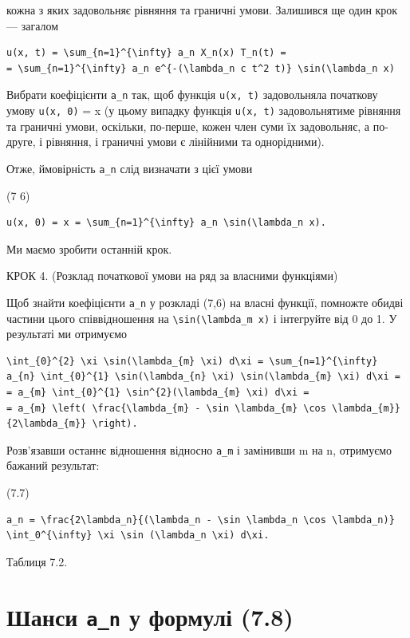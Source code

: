 \documentclass[
  ukrainian,
]{article}
\begin{document}
кожна з яких задовольняє рівняння та граничні умови. Залишився ще один
крок --- загалом

\begin{verbatim}
u(x, t) = \sum_{n=1}^{\infty} a_n X_n(x) T_n(t) =
= \sum_{n=1}^{\infty} a_n e^{-(\lambda_n c t^2 t)} \sin(\lambda_n x)
\end{verbatim}

Вибрати коефіцієнти \texttt{a\_n} так, щоб функція \texttt{u(x,\ t)}
задовольняла початкову умову \texttt{u(x,\ 0)} = x (у цьому випадку
функція \texttt{u(x,\ t)} задовольнятиме рівняння та граничні умови,
оскільки, по-перше, кожен член суми їх задовольняє, а по-друге, і
рівняння, і граничні умови є лінійними та однорідними).

Отже, ймовірність \texttt{a\_n} слід визначати з цієї умови

(7 6)

\begin{verbatim}
u(x, 0) = x = \sum_{n=1}^{\infty} a_n \sin(\lambda_n x).
\end{verbatim}

Ми маємо зробити останній крок.

КРОК 4. (Розклад початкової умови на ряд за власними функціями)

Щоб знайти коефіцієнти \texttt{a\_n} у розкладі (7,6) на власні функції,
помножте обидві частини цього співвідношення на
\texttt{\textbackslash{}sin(\textbackslash{}lambda\_m\ x)} і інтегруйте
від 0 до 1. У результаті ми отримуємо

\begin{verbatim}
\int_{0}^{2} \xi \sin(\lambda_{m} \xi) d\xi = \sum_{n=1}^{\infty} a_{n} \int_{0}^{1} \sin(\lambda_{n} \xi) \sin(\lambda_{m} \xi) d\xi =
= a_{m} \int_{0}^{1} \sin^{2}(\lambda_{m} \xi) d\xi =
= a_{m} \left( \frac{\lambda_{m} - \sin \lambda_{m} \cos \lambda_{m}}{2\lambda_{m}} \right).
\end{verbatim}

Розв'язавши останнє відношення відносно \texttt{a\_m} і замінивши m на
n, отримуємо бажаний результат:

(7.7)

\begin{verbatim}
a_n = \frac{2\lambda_n}{(\lambda_n - \sin \lambda_n \cos \lambda_n)} \int_0^{\infty} \xi \sin (\lambda_n \xi) d\xi.
\end{verbatim}

Таблиця 7.2.

\section{\texorpdfstring{Шанси \texttt{a\_n} у формулі
(7.8)}{Шанси a\_n у формулі (7.8)}}\label{ux448ux430ux43dux441ux438-a_n-ux443-ux444ux43eux440ux43cux443ux43bux456-7.8}
\end{document}
